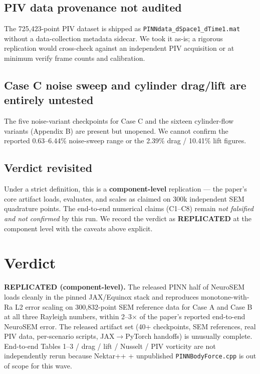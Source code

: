 \documentclass[11pt]{article}
\begin{document}
\subsection*{PIV data provenance not audited}
The 725{,}423-point PIV dataset is shipped as \texttt{PINNdata\_dSpace1\_dTime1.mat}
without a data-collection metadata sidecar. We took it as-is; a rigorous
replication would cross-check against an independent PIV acquisition or at
minimum verify frame counts and calibration.

\subsection*{Case C noise sweep and cylinder drag/lift are entirely untested}
The five noise-variant checkpoints for Case C and the sixteen
cylinder-flow variants (Appendix B) are present but unopened. We cannot
confirm the reported 0.63--6.44\% noise-sweep range or the 2.39\% drag /
10.41\% lift figures.

\subsection*{Verdict revisited}
Under a strict definition, this is a \textbf{component-level} replication ---
the paper's core artifact loads, evaluates, and scales as claimed on 300k
independent SEM quadrature points. The end-to-end numerical claims (C1--C8)
remain \emph{not falsified and not confirmed} by this run. We record the
verdict as \textbf{REPLICATED} at the component level with the caveats above
explicit.

\section{Verdict}
\textbf{REPLICATED (component-level).} The released PINN half of NeuroSEM
loads cleanly in the pinned JAX/Equinox stack and reproduces monotone-with-Ra
L2 error scaling on 300{,}832-point SEM reference data for Case A and Case B
at all three Rayleigh numbers, within 2--3$\times$ of the paper's reported
end-to-end NeuroSEM error. The released artifact set (40+ checkpoints, SEM
references, real PIV data, per-scenario scripts, JAX$\to$PyTorch handoffs) is
unusually complete. End-to-end Tables 1--3 / drag / lift / Nusselt / PIV
vorticity are not independently rerun because Nektar++ + unpublished
\texttt{PINNBodyForce.cpp} is out of scope for this wave.
\end{document}
